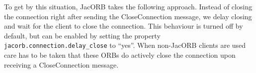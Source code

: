 To get by this situation, JacORB takes the following approach. Instead
of closing the connection right after sending the CloseConnection
message, we delay closing and wait for the client to close the
connection. This behaviour is turned off by default, but can be
enabled by setting the property {\tt jacorb.connection.delay\_close}
to ``yes''. When non-JacORB clients are used care has to be taken that
these ORBs do actively close the connection upon receiving a
CloseConnection message.

